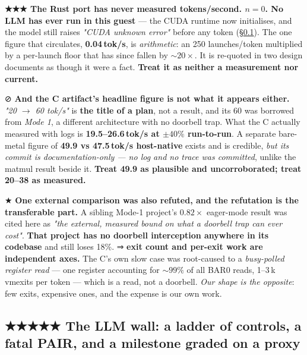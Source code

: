 \documentclass[10.5pt]{article}
\begin{document}
\begin{claimbox}\small
\textbf{★★★ The Rust port has never measured tokens/second. $n = 0$. No LLM has ever run in this
guest} — the CUDA runtime now initialises, and the model still raises \emph{"CUDA unknown
error"} before any token (\S\ref{sec:llmwall}). The one figure that circulates, \textbf{0.04\,tok/s}, is \emph{arithmetic}: an \assumed{} 250
launches/token multiplied by a per-launch floor that has since fallen by ${\sim}20\times$. It is
re-quoted in two design documents as though it were a fact. \textbf{Treat it as neither a
measurement nor current.}

\smallskip
⊘ \textbf{And the C artifact's headline figure is not what it appears either.} \emph{"20 $\to$ 60
tok/s"} is \textbf{the title of a plan}, not a result, and its 60 was borrowed from \emph{Mode 1},
a different architecture with no doorbell trap. What the C actually measured with logs is
\textbf{19.5--26.6\,tok/s at $\pm 40\%$ run-to-run}. A separate bare-metal figure of \textbf{49.9
vs 47.5\,tok/s host-native} exists and is credible, \emph{but its commit is documentation-only —
no log and no trace was committed}, unlike the matmul result beside it. \textbf{Treat 49.9 as
plausible and uncorroborated; treat 20--38 as measured.}

\smallskip
★ \textbf{One external comparison was also refuted, and the refutation is the transferable part.}
A sibling Mode-1 project's $0.82\times$ eager-mode result was cited here as \emph{"the external,
measured bound on what a doorbell trap can ever cost"}. \textbf{That project has no doorbell
interception anywhere in its codebase} and still loses 18\%. ⇒ \textbf{exit count and per-exit
work are independent axes.} The C's own slow case was root-caused to a \emph{busy-polled register
read} — one register accounting for ${\sim}99\%$ of all BAR0 reads, 1--3\,k vmexits per token —
which is a read, not a doorbell. \emph{Our shape is the opposite}: few exits, expensive ones, and
the expense is our own work.
\end{claimbox}

\subsection{\texorpdfstring{★★★★★ The LLM wall: a ladder of controls, a fatal PAIR, and a milestone graded on a proxy}{The LLM wall: a ladder of controls, a fatal PAIR, and a milestone graded on a proxy}}
\label{sec:llmwall}
\end{document}

